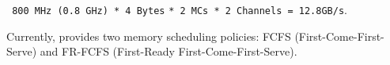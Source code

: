 \Verb+ 800 MHz (0.8 GHz) * 4 Bytes+
\Verb+* 2 MCs * 2 Channels = 12.8GB/s+.
 

\noindent Currently, \SIM provides two memory scheduling policies: FCFS 
(First-Come-First-Serve) and FR-FCFS (First-Ready First-Come-First-Serve).












